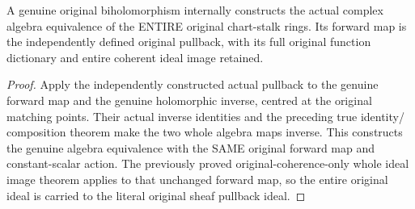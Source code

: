 \begin{theorem}
\label{hir:actual-biholomorphic-whole-original-germ-algebra-equivalence}
\leanok
A genuine original biholomorphism internally constructs the actual complex
algebra equivalence of the ENTIRE original chart-stalk rings. Its forward
map is the independently defined original pullback, with its full original
function dictionary and entire coherent ideal image retained.
\end{theorem}
\begin{proof}
Apply the independently constructed actual pullback to the genuine forward
map and the genuine holomorphic inverse, centred at the original matching
points. Their actual inverse identities and the preceding true identity/
composition theorem make the two whole algebra maps inverse. This constructs
the genuine algebra equivalence with the SAME original forward map and
constant-scalar action. The previously proved original-coherence-only whole
ideal image theorem applies to that unchanged forward map, so the entire
original ideal is carried to the literal original sheaf pullback ideal.
\end{proof}

